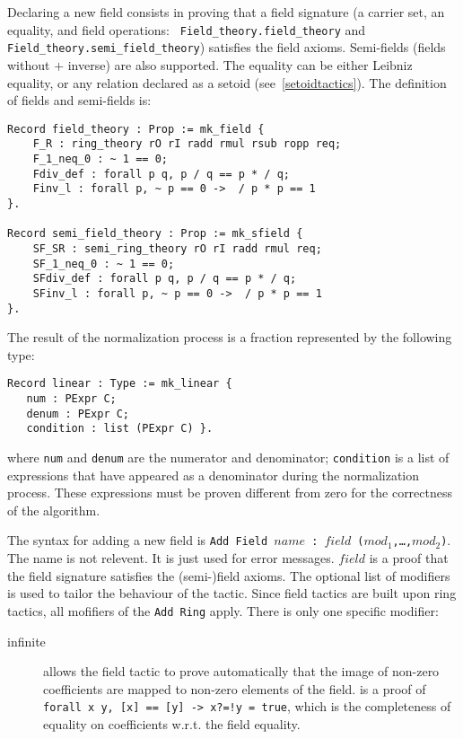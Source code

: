 


Declaring a new field consists in proving that a field signature (a
carrier set, an equality, and field operations: {\tt
Field\_theory.field\_theory} and {\tt Field\_theory.semi\_field\_theory})
satisfies the field axioms. Semi-fields (fields without $+$ inverse) are
also supported. The equality can be either Leibniz equality, or any
relation declared as a setoid (see~\ref{setoidtactics}). The definition
of fields and semi-fields is:
\begin{verbatim}
Record field_theory : Prop := mk_field {
    F_R : ring_theory rO rI radd rmul rsub ropp req;
    F_1_neq_0 : ~ 1 == 0;
    Fdiv_def : forall p q, p / q == p * / q;
    Finv_l : forall p, ~ p == 0 ->  / p * p == 1
}.

Record semi_field_theory : Prop := mk_sfield {
    SF_SR : semi_ring_theory rO rI radd rmul req;
    SF_1_neq_0 : ~ 1 == 0;
    SFdiv_def : forall p q, p / q == p * / q;
    SFinv_l : forall p, ~ p == 0 ->  / p * p == 1
}.
\end{verbatim}

The result of the normalization process is a fraction represented by
the following type:
\begin{verbatim}
Record linear : Type := mk_linear {
   num : PExpr C;
   denum : PExpr C;
   condition : list (PExpr C) }.
\end{verbatim}
where {\tt num} and {\tt denum} are the numerator and denominator;
{\tt condition} is a list of expressions that have appeared as a
denominator during the normalization process. These expressions must
be proven different from zero for the correctness of the algorithm.

The syntax for adding a new field is {\tt Add Field $name$ : $field$
($mod_1$,\dots,$mod_2$)}.  The name is not relevent. It is just used
for error messages. $field$ is a proof that the field signature
satisfies the (semi-)field axioms. The optional list of modifiers is
used to tailor the behaviour of the tactic. Since field tactics are
built upon ring tactics, all mofifiers of the {\tt Add Ring}
apply. There is only one specific modifier:
\begin{description}
\item[infinite \term] allows the field tactic to prove
  automatically that the image of non-zero coefficients are mapped to
  non-zero elements of the field. \term is a proof of {\tt forall x y,
    [x] == [y] -> x?=!y = true}, which is the completeness of equality
  on coefficients w.r.t. the field equality.
\end{description}

